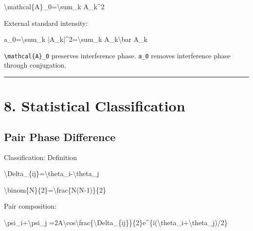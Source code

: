 \documentclass[
  a4paper,
]{article}
\newenvironment{Shaded}{}{}
\newcommand{\NormalTok}[1]{#1}
\begin{document}
\begin{Shaded}
\begin{Highlighting}[]
\NormalTok{\textbackslash{}mathcal\{A\}\_0=\textbackslash{}sum\_k A\_k\^{}2}
\end{Highlighting}
\end{Shaded}

External standard intensity:

\begin{Shaded}
\begin{Highlighting}[]
\NormalTok{a\_0=\textbackslash{}sum\_k |A\_k|\^{}2=\textbackslash{}sum\_k A\_k\textbackslash{}bar A\_k}
\end{Highlighting}
\end{Shaded}

\texttt{\textbackslash{}mathcal\{A\}\_0} preserves interference phase.
\texttt{a\_0} removes interference phase through conjugation.

\begin{center}\rule{0.5\linewidth}{0.5pt}\end{center}

\section{8. Statistical
Classification}\label{statistical-classification}

\subsection{Pair Phase Difference}\label{pair-phase-difference}

Classification: Definition

\begin{Shaded}
\begin{Highlighting}[]
\NormalTok{\textbackslash{}Delta\_\{ij\}=\textbackslash{}theta\_i{-}\textbackslash{}theta\_j}
\end{Highlighting}
\end{Shaded}

\begin{Shaded}
\begin{Highlighting}[]
\NormalTok{\textbackslash{}binom\{N\}\{2\}=\textbackslash{}frac\{N(N{-}1)\}\{2\}}
\end{Highlighting}
\end{Shaded}

Pair composition:

\begin{Shaded}
\begin{Highlighting}[]
\NormalTok{\textbackslash{}psi\_i+\textbackslash{}psi\_j}
\NormalTok{=2A\textbackslash{}cos\textbackslash{}frac\{\textbackslash{}Delta\_\{ij\}\}\{2\}e\^{}\{i(\textbackslash{}theta\_i+\textbackslash{}theta\_j)/2\}}
\end{Highlighting}
\end{Shaded}
\end{document}
